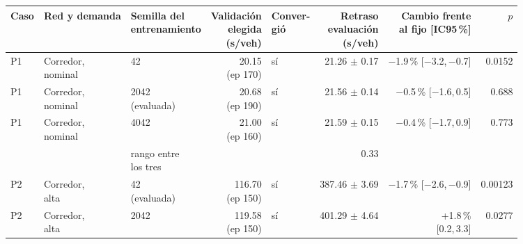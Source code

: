 \begin{table}[H]
\centering
\scriptsize
\setlength{\tabcolsep}{3pt}
\begin{tabular}{lllrlrrr}
\toprule
Caso & Red y demanda & \makecell{Semilla del\\entrenamiento} & \makecell{Validación\\elegida\\(s/veh)} & \makecell{Conver-\\gió} & \makecell{Retraso\\evaluación\\(s/veh)} & \makecell{Cambio frente\\al fijo [IC95\,\%]} & $p$ \\
\midrule
P1 & \makecell[l]{Corredor,\\{}nominal} & 42 & \makecell[r]{20.15\\{}(ep 170)} & sí & \makecell[r]{21.26\\{}$\pm$ 0.17} & \makecell[r]{$-$1.9\,\%\\{}[$-$3.2,\,$-$0.7]} & 0.0152 \\
P1 & \makecell[l]{Corredor,\\{}nominal} & \makecell[l]{2042\\{}(evaluada)} & \makecell[r]{20.68\\{}(ep 190)} & sí & \makecell[r]{21.56\\{}$\pm$ 0.14} & \makecell[r]{$-$0.5\,\%\\{}[$-$1.6,\,0.5]} & 0.688 \\
P1 & \makecell[l]{Corredor,\\{}nominal} & 4042 & \makecell[r]{21.00\\{}(ep 160)} & sí & \makecell[r]{21.59\\{}$\pm$ 0.15} & \makecell[r]{$-$0.4\,\%\\{}[$-$1.7,\,0.9]} & 0.773 \\
 & & \makecell[l]{rango entre\\{}los tres} & & & 0.33 & & \\
P2 & \makecell[l]{Corredor,\\{}alta} & \makecell[l]{42\\{}(evaluada)} & \makecell[r]{116.70\\{}(ep 150)} & sí & \makecell[r]{387.46\\{}$\pm$ 3.69} & \makecell[r]{$-$1.7\,\%\\{}[$-$2.6,\,$-$0.9]} & 0.00123 \\
P2 & \makecell[l]{Corredor,\\{}alta} & 2042 & \makecell[r]{119.58\\{}(ep 150)} & sí & \makecell[r]{401.29\\{}$\pm$ 4.64} & \makecell[r]{+1.8\,\%\\{}[0.2,\,3.3]} & 0.0277 \\

\end{tabular}
\end{table}
